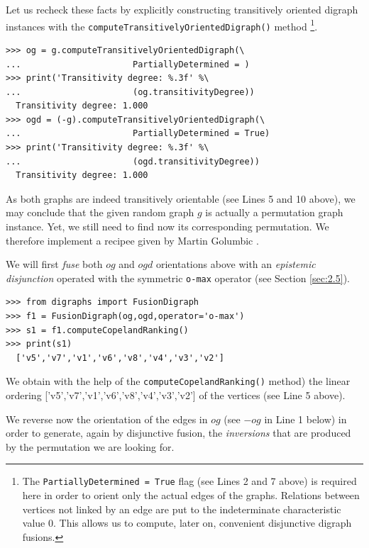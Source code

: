 Let us recheck these facts by explicitly constructing transitively oriented digraph instances with the \texttt{computeTransitivelyOrientedDigraph()} method \footnote{The \texttt{PartiallyDetermined = True} flag (see Lines 2 and 7 above) is required here in order to orient only the actual edges of the graphs. Relations between vertices not linked by an edge are put to the indeterminate characteristic value $0$. This allows us to compute, later on, convenient disjunctive digraph fusions.
}. 
\begin{lstlisting}
>>> og = g.computeTransitivelyOrientedDigraph(\
...                      PartiallyDetermined = )
>>> print('Transitivity degree: %.3f' %\
...                      (og.transitivityDegree)) 
  Transitivity degree: 1.000
>>> ogd = (-g).computeTransitivelyOrientedDigraph(\
...                      PartiallyDetermined = True)
>>> print('Transitivity degree: %.3f' %\
...                      (ogd.transitivityDegree)) 
  Transitivity degree: 1.000
\end{lstlisting}

As both graphs are indeed transitively orientable (see Lines 5 and 10 above), we may conclude that the given random graph $g$ is actually a permutation graph instance. Yet, we still need to find now its corresponding permutation. We therefore implement a recipee given by Martin Golumbic \citep[p. 159]{GOL-2004}.

We will first \emph{fuse} both $og$ and $ogd$ orientations above with an \emph{epistemic disjunction} operated with the symmetric \texttt{o-max} operator (see Section \ref{sec:2.5}).
\begin{lstlisting}
>>> from digraphs import FusionDigraph
>>> f1 = FusionDigraph(og,ogd,operator='o-max')
>>> s1 = f1.computeCopelandRanking()
>>> print(s1)
  ['v5','v7','v1','v6','v8','v4','v3','v2']
\end{lstlisting}
We obtain with the help of the \texttt{computeCopelandRanking()} method) the linear ordering ['v5','v7','v1','v6','v8','v4','v3','v2'] of the vertices (see Line 5 above).

We reverse now the orientation of the edges in $og$ (see $-og$ in Line 1 below) in order to generate, again by disjunctive fusion, the \emph{inversions} that are produced by the permutation we are looking for.


